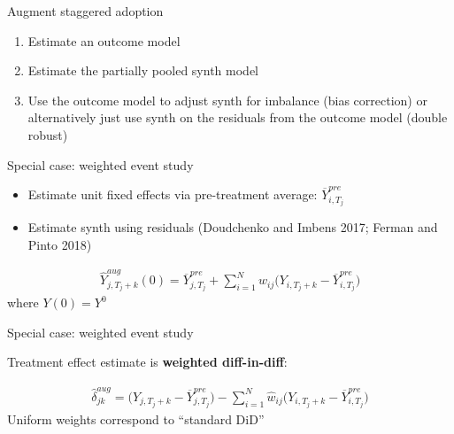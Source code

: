 \documentclass{beamer}
\begin{document}








\begin{frame}{Augment staggered adoption}

\begin{enumerate}
\item Estimate an outcome model
\item Estimate the partially pooled synth model
\item Use the outcome model to adjust synth for imbalance (bias correction) or alternatively just use synth on the residuals from the outcome model (double robust)
\end{enumerate}

\end{frame}

\begin{frame}{Special case: weighted event study}

\begin{itemize}
\item Estimate unit fixed effects via pre-treatment average: $\overline{Y}_{i,T_j}^{pre}$
\item Estimate synth using residuals (Doudchenko and Imbens 2017; Ferman and Pinto 2018)
\end{itemize}


\begin{eqnarray*}
\widehat{Y}^{aug}_{j,T_j+k}(0) = \overline{Y}_{j,T_j}^{pre} + \sum_{i=1}^N \widehat{w}_{ij} \bigg ( Y_{i,T_j+k} - \overline{Y}_{i,T_j}^{pre} \bigg )
\end{eqnarray*}where $Y(0)=Y^0$

\end{frame}

\begin{frame}{Special case: weighted event study}

Treatment effect estimate is \textbf{weighted diff-in-diff}:

\begin{eqnarray*}
\widehat{\delta}_{jk}^{aug} = \bigg ( Y_{j,T_j+k} - \overline{Y}_{j,T_j}^{pre} \bigg ) - \sum_{i=1}^N \widehat{w}_{ij} \bigg (Y_{i,T_j+k} - \overline{Y}_{i,T_j}^{pre} \bigg )
\end{eqnarray*}Uniform weights correspond to ``standard DiD''

\end{frame}
\end{document}
